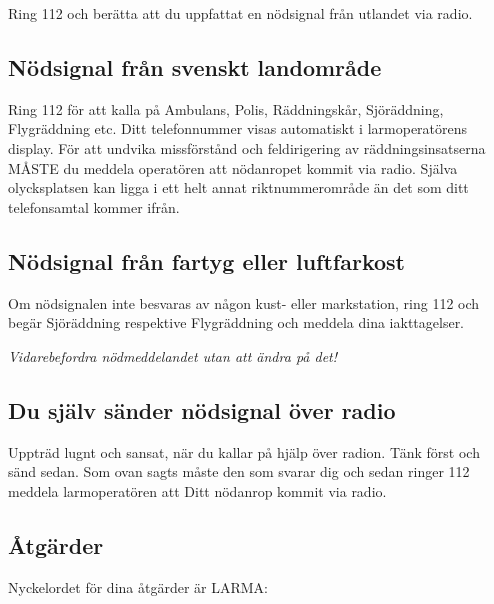 Ring 112 och berätta att du uppfattat en nödsignal från utlandet via radio.

\subsection{Nödsignal från svenskt landområde}

Ring 112 för att kalla på Ambulans, Polis, Räddningskår, Sjöräddning,
Flygräddning etc. Ditt telefonnummer visas automatiskt i larmoperatörens
display. För att undvika missförstånd och feldirigering av
räddningsinsatserna MÅSTE du meddela operatören att nödanropet kommit via radio.
Själva olycksplatsen kan ligga i ett helt annat riktnummerområde än det som ditt
telefonsamtal kommer ifrån.

\subsection{Nödsignal från fartyg eller luftfarkost}

Om nödsignalen inte besvaras av någon kust- eller markstation, ring 112
och begär Sjöräddning respektive Flygräddning och meddela dina
iakttagelser.

\emph{Vidarebefordra nödmeddelandet utan att ändra på det!}

\subsection{Du själv sänder nödsignal över radio}

Uppträd lugnt och sansat, när du kallar på hjälp över radion. Tänk först och
sänd sedan. Som ovan sagts måste den som svarar dig och sedan ringer 112 meddela
larmoperatören att Ditt nödanrop kommit via radio.

\subsection{Åtgärder}

Nyckelordet för dina åtgärder är LARMA:

